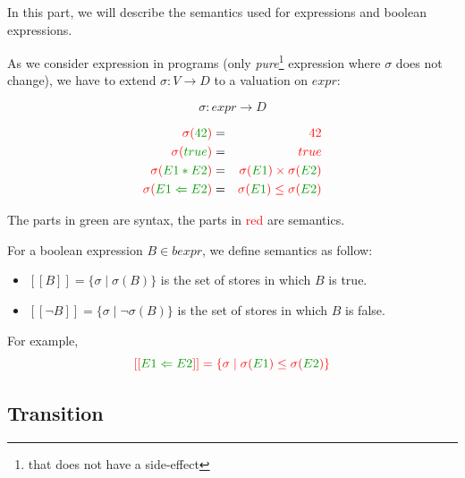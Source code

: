 \documentclass[12pt, a4paper]{book}
\begin{document}
In this part, we will describe the semantics used for expressions and boolean
expressions. \newline

As we consider expression in programs (only \textit{pure}\footnote{that does
not have a side-effect} expression where $\sigma$ does not change), we have to
extend $\sigma : V \rightarrow D$ to a valuation on $expr$:

$$
\sigma : expr \rightarrow D
$$

\begin{eqnarray}
    \textcolor{red}{\sigma(}\textcolor{green!60!black}{42}\textcolor{red}{)} & = & \textcolor{red}{42} \\
    \textcolor{red}{\sigma(}\textcolor{green!60!black}{true}\textcolor{red}{)} & = & \textcolor{red}{true} \\
    \textcolor{red}{\sigma(}\textcolor{green!60!black}{E1*E2}\textcolor{red}{)} & = & \textcolor{red}{\sigma(}\textcolor{green!60!black}{E1}\textcolor{red}{) \times \sigma(}\textcolor{green!60!black}{E2}\textcolor{red}{)} \\
    \textcolor{red}{\sigma(}\textcolor{green!60!black}{E1<=E2}\textcolor{red}{)} & = & \textcolor{red}{\sigma(}\textcolor{green!60!black}{E1}\textcolor{red}{) \le \sigma(}\textcolor{green!60!black}{E2}\textcolor{red}{)}
\end{eqnarray}

The parts in \textcolor{green!60!black}{green} are syntax, the parts in
\textcolor{red}{red} are semantics. \newline

For a boolean expression $B \in bexpr$, we define semantics as follow:

\begin{itemize}
    \item $[[B]] = \{\sigma \mid \sigma(B)\}$ is the set of stores in which $B$
    is true.
    \item $[[\lnot B]] = \{\sigma \mid \lnot \sigma(B)\}$ is the set of stores
    in which $B$ is false.
\end{itemize}

For example,
$$
\textcolor{red}{[[}\textcolor{green!60!black}{E1<=E2}\textcolor{red}{]] = \{\sigma \mid \sigma(}\textcolor{green!60!black}{E1}\textcolor{red}{) \le \sigma(}\textcolor{green!60!black}{E2}\textcolor{red}{)\}}
$$

\subsection{Transition}
\label{sub:Transition}
\end{document}

